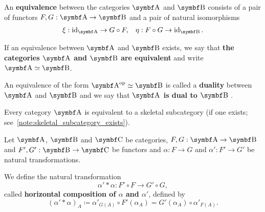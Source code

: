 \begin{definition}\label{def:category_equivalence}\cite[definition 1.3.15]{Leinster2014}
  An \textbf{equivalence} between the categories \( \Bold A \) and \( \Bold B \) consists of a pair of functors \( F, G: \Bold A \to \Bold B \) and a pair of natural isomorphisms
  \begin{align*}
    \xi: \Id_{\Bold A} \to G \circ F,
    &&
    \eta: F \circ G \to \Id_{\Bold B}.
  \end{align*}

  If an equivalence between \( \Bold A \) and \( \Bold B \) exists, we say that \textbf{the categories \( \Bold A \) and \( \Bold B \) are equivalent} and write \( \Bold A \simeq \Bold B \).

  An equivalence of the form \( \Bold{A}^{\Op} \simeq \Bold{B} \) is called a \textbf{duality} between \( \Bold A \) and \( \Bold B \) and we say that \textbf{\( \Bold A \) is dual to \( \Bold B \)} \cite[example 1.3.22]{Leinster2014}.
\end{definition}

\begin{proposition}\label{thm:skeletal_subcategory_equivalence}\cite[91]{MacLane1994}
  Every category \( \Bold A \) is equivalent to a skeletal subcategory (if one exists; see~\cref{note:skeletal_subcategory_exists}).
\end{proposition}

\begin{definition}\label{def:natural_transformation_horizontal_composition}\cite[remarks 1.3.24]{Leinster2014}
  Let \( \Bold A \), \( \Bold B \) and \( \Bold C \) be categories, \( F, G: \Bold A \to \Bold B \) and \( F', G': \Bold B \to \Bold C \) be functors and \( \alpha: F \to G \) and \( \alpha': F' \to G' \) be natural transformations.
  \begin{Center}
  \end{Center}

  We define the natural transformation
  \begin{equation*}
    \alpha' * \alpha: F' \circ F \to G' \circ G,
  \end{equation*}
  called \textbf{horizontal composition of \( \alpha \) and \( \alpha' \)}, defined by
  \begin{equation*}
    (\alpha' * \alpha)_A \coloneqq \alpha'_{G(A)} \circ F'(\alpha_A) = G'(\alpha_A) \circ \alpha'_{F(A)}.
  \end{equation*}
\end{definition}

